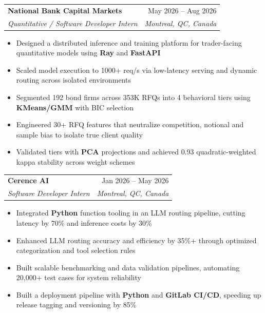 \documentclass[letterpaper,11pt]{article}
\makeatletter
\newcommand{\resumeItem}[1]{
  \item\small{
    {#1 \vspace{-2pt}}
  }
}
\newcommand{\resumeSubheading}[4]{
  \vspace{-2pt}\item
    \begin{tabular*}{0.97\textwidth}[t]{l@{\extracolsep{\fill}}r}
      \textbf{#1} & #2 \\
      \textit{\small#3} & \textit{\small #4} \\
    \end{tabular*}\vspace{-7pt}
}
\newcommand{\resumeItemListStart}{\begin{itemize}}
\newcommand{\resumeItemListEnd}{\end{itemize}\vspace{-5pt}}
\makeatother
\begin{document}
\resumeSubheading
{National Bank Capital Markets}{May 2026 -- Aug 2026}
{Quantitative / Software Developer Intern}{Montreal, QC, Canada}
\resumeItemListStart
\resumeItem{Designed a distributed inference and training platform for trader-facing quantitative models using \textbf{Ray} and \textbf{FastAPI}}
\resumeItem{Scaled model execution to 1000+ req/s via low-latency serving and dynamic routing across isolated environments}
\resumeItem{Segmented 192 bond firms across 353K RFQs into 4 behavioral tiers using \textbf{KMeans/GMM} with BIC selection}
\resumeItem{Engineered 30+ RFQ features that neutralize competition, notional and sample bias to isolate true client quality}
\resumeItem{Validated tiers with \textbf{PCA} projections and achieved 0.93 quadratic-weighted kappa stability across weight schemes}
\resumeItemListEnd


\resumeSubheading
{Cerence AI}{Jan 2026 -- May 2026}
{Software Developer Intern}{Montreal, QC, Canada}
\resumeItemListStart
\resumeItem{Integrated \textbf{Python} function tooling in an LLM routing pipeline, cutting latency by 70\% and inference costs by 30\%}
\resumeItem{Enhanced LLM routing accuracy and efficiency by 35\%+ through optimized categorization and tool selection rules}
\resumeItem{Built scalable benchmarking and data validation pipelines, automating 20,000+ test cases for system reliability}
\resumeItem{Built a deployment pipeline with \textbf{Python} and \textbf{GitLab CI/CD}, speeding up release tagging and versioning by 85\%}
\resumeItemListEnd
\end{document}

